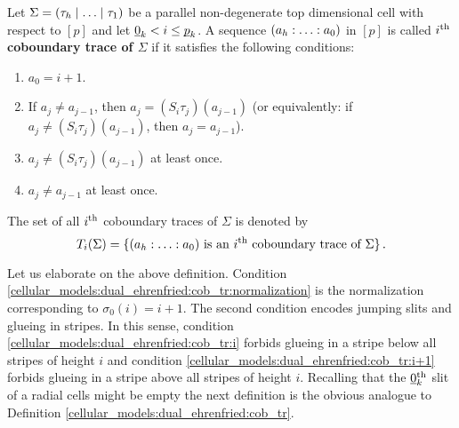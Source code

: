 \begin{defi}
    \label{cellular_models:dual_ehrenfried:cob_tr}
    Let $\Sigma = \inhom$ be a parallel non-degenerate top dimensional cell with respect to $[p]$ and let $\underline{\smash{0}}_k < i \le \underline{\smash{p}}_k$.
    A sequence $\homog[a]$ in $[p]$ is called $i^{\text{th}}$ {\bf coboundary trace of $\Sigma$} if it satisfies the following conditions:
    \begin{enumerate}
        \item \label{cellular_models:dual_ehrenfried:cob_tr:normalization} $a_0 = i+1$.
        \item \label{cellular_models:dual_ehrenfried:cob_tr:choice} If $a_j \neq a_{j-1}$, then $a_j = (S_i\tau_j)(a_{j-1})$
                    (or equivalently: if $a_j \neq (S_i\tau_j)(a_{j-1})$, then $a_j = a_{j-1}$).
        \item \label{cellular_models:dual_ehrenfried:cob_tr:i} $a_j \neq (S_i\tau_j)(a_{j-1})$ at least once.
        \item \label{cellular_models:dual_ehrenfried:cob_tr:i+1} $a_j \neq a_{j-1}$ at least once.
    \end{enumerate}
    The set of all $i^{\text{th}}$ coboundary traces of $\Sigma$ is denoted by
    \[
        T_i(\Sigma) = \{ (a_h : \ldots : a_0) \text{ is an $i\Th$ coboundary trace of $\Sigma$} \} \,.
    \]
\end{defi}

Let us elaborate on the above definition.
Condition \ref{cellular_models:dual_ehrenfried:cob_tr:normalization} is the normalization corresponding to $\sigma_0(i) = i+1$.
The second condition encodes jumping slits and glueing in stripes.
In this sense, condition \ref{cellular_models:dual_ehrenfried:cob_tr:i} forbids glueing in a stripe below all stripes of height $i$ and
condition \ref{cellular_models:dual_ehrenfried:cob_tr:i+1} forbids glueing in a stripe above all stripes of height $i$.
Recalling that the $\underline{\smash{0}}_k^{\text{th}}$ slit of a radial cells might be empty the next definition is the obvious analogue to Definition \ref{cellular_models:dual_ehrenfried:cob_tr}.


